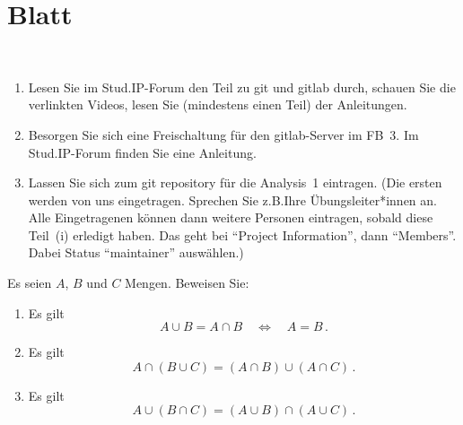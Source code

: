 \section{Blatt}


\begin{aufg}[2 Punkte]\mbox{ }
\begin{enumerate}[label=$\mathrm{(\roman*)}$, ref=$\mathrm{\roman*}$]
\item Lesen Sie im Stud.IP-Forum den Teil zu git und gitlab durch, schauen Sie die verlinkten Videos, lesen Sie (mindestens einen Teil) der Anleitungen.
\item Besorgen Sie sich eine Freischaltung für den gitlab-Server im FB~3. Im Stud.IP-Forum finden Sie eine Anleitung.
\item Lassen Sie sich zum git repository f\"ur die Analysis~1 eintragen. (Die ersten werden von uns eingetragen. Sprechen Sie z.B.\@ Ihre \"Ubungsleiter*innen an. Alle Eingetragenen k\"onnen dann weitere Personen eintragen, sobald diese Teil~(i) erledigt haben. Das geht bei ``Project Information'', dann ``Members''. Dabei Status ``maintainer'' ausw\"ahlen.) 
\end{enumerate}
\end{aufg}

\bigskip

\begin{aufg}[6 Punkte]
Es seien $A$, $B$ und $C$ Mengen. Beweisen Sie: 
\begin{enumerate}[label=$\mathrm{(\roman*)}$, ref=$\mathrm{\roman*}$]
 \item Es gilt 
 \[
  A\cup B = A\cap B \quad\Leftrightarrow\quad  A=B\,.
 \]
 \item Es gilt 
 \[
  A \cap (B \cup C) = (A\cap B) \cup (A\cap C)\,.
 \]
 \item Es gilt 
 \[
  A \cup (B \cap C) = (A\cup B) \cap (A\cup C)\,.
 \]
\end{enumerate}
\end{aufg}
 
\bigskip 


